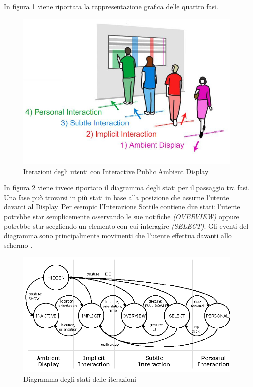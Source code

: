 \noindent In figura \ref{fig:phasesStages} viene riportata la rappresentazione grafica delle quattro fasi.

\begin{figure}[H]
    \includegraphics[width=\linewidth]{img/publicToPersonal.jpg}
    \caption{Iterazioni degli utenti con Interactive Public Ambient Display \cite{interactive}}
    \label{fig:phasesStages}
\end{figure}
\noindent In figura \ref{fig:phasesStates} viene invece riportato il diagramma degli stati per il passaggio tra fasi. Una fase può trovarsi in più stati in base alla posizione che assume l'utente davanti al Display. Per esempio l'Interazione Sottile contiene due stati: l'utente potrebbe star semplicemente osservando le sue notifiche \textit{(OVERVIEW)} oppure potrebbe star scegliendo un elemento con cui interagire \textit{(SELECT)}. Gli eventi del diagramma sono principalmente movimenti che l'utente effettua davanti allo schermo \cite{interactive}.

\begin{figure}[H]
     \includegraphics[width=\linewidth]{img/stateDiagram.png}
     \caption{Diagramma degli stati delle iterazioni \cite{interactive}}
     \label{fig:phasesStates}
\end{figure}

